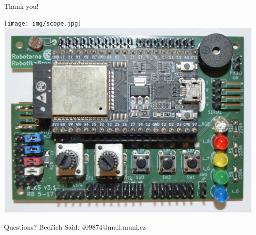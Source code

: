 \documentclass[
aspectratio=169,
]{beamer}
\begin{document}
\begin{frame}{Thank you!}
	\begin{center}
		\texttt{[image: img/scope.jpg]}
		\includegraphics[height=.6\textheight]{img/alks.jpg}
		\vspace{0.5cm}
		\begin{block}{\centering Questions?}
			\centering Bed\v{r}ich Said: 409874@mail.muni.cz
		\end{block}
	\end{center}
\end{frame}




\end{document}

